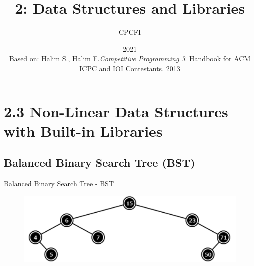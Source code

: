 \documentclass{beamer}
\title{2: Data Structures and Libraries}
\author{CPCFI}
\institute{UNAM's School of Engineering}
\date{2021 \\ \vspace{0.5cm} \scriptsize{Based on: Halim S., Halim F.\textit{Competitive Programming 3}}. Handbook for ACM ICPC and IOI Contestants. 2013}
\begin{document}
\frame{\titlepage}


\section{2.3  Non-Linear Data Structures with Built-in Libraries}

\subsection{Balanced Binary Search Tree (BST)}
\begin{frame}{Balanced Binary Search Tree - BST}
    \begin{figure}
        \centering
        \includegraphics[scale=0.4]{imgs/2.3/bst/bst.png}
    \end{figure}
\end{frame}
\end{document}
